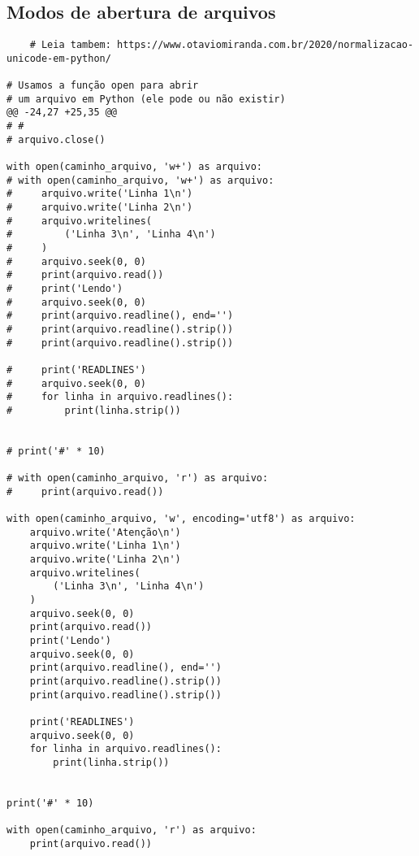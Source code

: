 \documentclass{article}
\begin{document}
\subsection{Modos de abertura de arquivos}
\begin{lstlisting}
    # Leia tambem: https://www.otaviomiranda.com.br/2020/normalizacao-unicode-em-python/

# Usamos a função open para abrir
# um arquivo em Python (ele pode ou não existir)
@@ -24,27 +25,35 @@
# #
# arquivo.close()

with open(caminho_arquivo, 'w+') as arquivo:
# with open(caminho_arquivo, 'w+') as arquivo:
#     arquivo.write('Linha 1\n')
#     arquivo.write('Linha 2\n')
#     arquivo.writelines(
#         ('Linha 3\n', 'Linha 4\n')
#     )
#     arquivo.seek(0, 0)
#     print(arquivo.read())
#     print('Lendo')
#     arquivo.seek(0, 0)
#     print(arquivo.readline(), end='')
#     print(arquivo.readline().strip())
#     print(arquivo.readline().strip())

#     print('READLINES')
#     arquivo.seek(0, 0)
#     for linha in arquivo.readlines():
#         print(linha.strip())


# print('#' * 10)

# with open(caminho_arquivo, 'r') as arquivo:
#     print(arquivo.read())

with open(caminho_arquivo, 'w', encoding='utf8') as arquivo:
    arquivo.write('Atenção\n')
    arquivo.write('Linha 1\n')
    arquivo.write('Linha 2\n')
    arquivo.writelines(
        ('Linha 3\n', 'Linha 4\n')
    )
    arquivo.seek(0, 0)
    print(arquivo.read())
    print('Lendo')
    arquivo.seek(0, 0)
    print(arquivo.readline(), end='')
    print(arquivo.readline().strip())
    print(arquivo.readline().strip())

    print('READLINES')
    arquivo.seek(0, 0)
    for linha in arquivo.readlines():
        print(linha.strip())


print('#' * 10)

with open(caminho_arquivo, 'r') as arquivo:
    print(arquivo.read())
\end{lstlisting}
\end{document}
